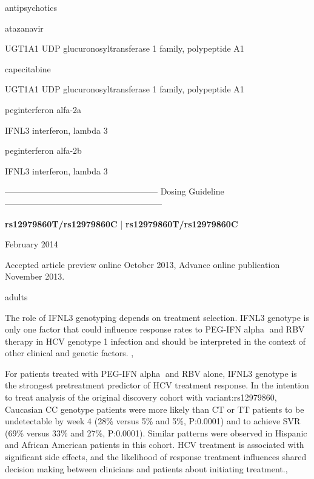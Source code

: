 \documentclass{resume} %
\begin{document}
\begin{rSection}{ antipsychotics }
\begin{rSection}{ atazanavir }
\begin{rSubsection}{ UGT1A1 }{ UDP glucuronosyltransferase 1 family, polypeptide A1 }{}{}
\begin{rSection}{ capecitabine }
\begin{rSubsection}{ UGT1A1 }{ UDP glucuronosyltransferase 1 family, polypeptide A1 }{}{}
\begin{rSection}{ peginterferon alfa-2a }
\begin{rSubsection}{ IFNL3 }{ interferon, lambda 3 }{}{}
\end{rSubsection}
\end{rSection}\begin{rSection}{ peginterferon alfa-2b }
\item[]
\begin{rSubsection}{ IFNL3 }{ interferon, lambda 3 }{}{}
\item[]
\item[] ------------------------------------------------------ Dosing Guideline --------------------------------------------------------\newline
\item[]
\item[] \textbf{ rs12979860T/rs12979860C } | \textbf{ rs12979860T/rs12979860C }
\item February 2014
 \newline
\item Accepted article preview online October 2013,  Advance online publication November 2013.
 \newline
\item adults
 \newline
\item The role of IFNL3 genotyping depends on treatment selection. IFNL3 genotype is only one factor that could influence response rates to PEG-IFN alpha and RBV therapy in HCV genotype 1 infection and should be interpreted in the context of other clinical and genetic factors. , 
 \newline
\item For patients treated with PEG-IFN alpha and RBV alone, IFNL3 genotype is the strongest pretreatment predictor of HCV treatment response. In the intention to treat analysis of the original discovery cohort with variant:rs12979860, Caucasian CC genotype patients were more likely than CT or TT patients to be undetectable by week 4 (28\% versus 5\% and 5\%, P:0.0001) and to achieve SVR (69\% versus 33\% and 27\%, P:0.0001). Similar patterns were observed in Hispanic and African American patients in this cohort. HCV treatment is associated with significant side effects, and the likelihood of response treatment influences shared decision making between clinicians and patients about initiating treatment.,  
 \newline

\end{rSubsection}
\end{rSection}
\end{rSubsection}
\end{rSection}
\end{rSubsection}
\end{rSection}
\end{rSection}
\end{document}
